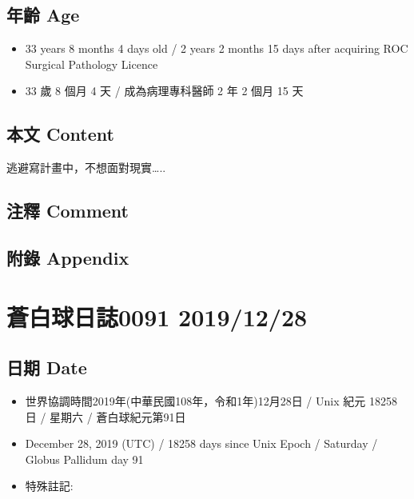 \documentclass[
]{article}
\providecommand{\tightlist}{%
  \setlength{\itemsep}{0pt}\setlength{\parskip}{0pt}}
\begin{document}
\hypertarget{ux5e74ux9f61-age-26}{%
\subsection{年齡 Age}\label{ux5e74ux9f61-age-26}}

\begin{itemize}
\tightlist
\item
  33 years 8 months 4 days old / 2 years 2 months 15 days after
  acquiring ROC Surgical Pathology Licence
\item
  33 歲 8 個月 4 天 / 成為病理專科醫師 2 年 2 個月 15 天
\end{itemize}

\hypertarget{ux672cux6587-content-26}{%
\subsection{本文 Content}\label{ux672cux6587-content-26}}

逃避寫計畫中，不想面對現實\ldots..

\hypertarget{ux6ce8ux91cb-comment-25}{%
\subsection{注釋 Comment}\label{ux6ce8ux91cb-comment-25}}

\hypertarget{ux9644ux9304-appendix-26}{%
\subsection{附錄 Appendix}\label{ux9644ux9304-appendix-26}}

\hypertarget{ux84bcux767dux7403ux65e5ux8a8c0091-20191228}{%
\section{蒼白球日誌0091
2019/12/28}\label{ux84bcux767dux7403ux65e5ux8a8c0091-20191228}}

\hypertarget{ux65e5ux671f-date-27}{%
\subsection{日期 Date}\label{ux65e5ux671f-date-27}}

\begin{itemize}
\tightlist
\item
  世界協調時間2019年(中華民國108年，令和1年)12月28日 / Unix 紀元 18258
  日 / 星期六 / 蒼白球紀元第91日
\item
  December 28, 2019 (UTC) / 18258 days since Unix Epoch / Saturday /
  Globus Pallidum day 91
\item
  特殊註記:
\end{itemize}
\end{document}
